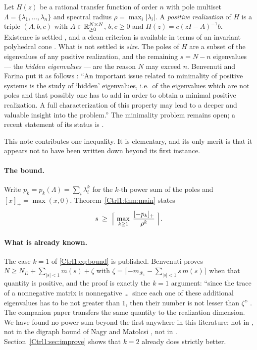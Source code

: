 Let $H(z)$ be a rational transfer function of order $n$ with pole multiset
$\Lambda=\{\lambda_1,\dots,\lambda_n\}$ and spectral radius
$\rho=\max_i|\lambda_i|$. A \emph{positive realization} of $H$ is a triple
$(A,b,c)$ with $A\in\mathbb{R}_{\ge0}^{N\times N}$, $b,c\ge0$ and
$H(z)=c(zI-A)^{-1}b$. Existence is settled \cite{Farina96,ADFB96,OMK84}, and a clean
criterion is available in terms of an invariant polyhedral cone \cite{BF04}. What is not
settled is \emph{size}. The poles of $H$ are a subset of the eigenvalues of any positive
realization, and the remaining $s=N-n$ eigenvalues --- the \emph{hidden eigenvalues} --- are
the reason $N$ may exceed $n$. Benvenuti and Farina put it as follows
\cite[\S IX]{BF04}: ``An important issue related to minimality of positive systems is the
study of `hidden' eigenvalues, i.e.\ of the eigenvalues which are not poles and that
possibly one has to add in order to obtain a minimal positive realization. A full
characterization of this property may lead to a deeper and valuable insight into the
problem.'' The minimality problem remains open; a recent statement of its status is
\cite{TS25}.

This note contributes one inequality. It is elementary, and its only merit is that it
appears not to have been written down beyond its first instance.

\paragraph{The bound.} Write $p_k=p_k(\Lambda)=\sum_{i}\lambda_i^{k}$ for the $k$-th power
sum of the poles and $[x]_+=\max(x,0)$. Theorem~\ref{Ctrl1:thm:main} states
\begin{equation}\label{Ctrl1:eq:bound}
s\;\ge\;\Bigl\lceil\;\max_{k\ge1}\;\frac{[-p_k]_+}{\rho^{k}}\;\Bigr\rceil .
\end{equation}

\paragraph{What is already known.} The case $k=1$ of \eqref{Ctrl1:eq:bound} is published.
Benvenuti \cite[Thm.~4.7]{Ben20ELA} proves $N\ge N_D+\sum_{|s|<1}m(s)+\zeta$ with
$\zeta=\lceil-m_{\mathcal R_1}-\sum_{|s|<1}s\,m(s)\rceil$ when that quantity is positive,
and the proof is exactly the $k=1$ argument: ``since the trace of a nonnegative matrix is
nonnegative \dots\ since each one of these additional eigenvalues has to be not greater
than $1$, then their number is not lesser than $\zeta$''
\cite[pp.~379--380]{Ben20ELA}. The companion paper \cite{Ben20SCL} transfers the same
quantity to the realization dimension. We have found no power sum beyond the first
anywhere in this literature: not in \cite{Ben20ELA,Ben20SCL}, not in the digraph bound of
Nagy and Matolcsi \cite{NM03}, not in \cite{BF04,TS25}. Section~\ref{Ctrl1:sec:improve} shows
that $k=2$ already does strictly better.

